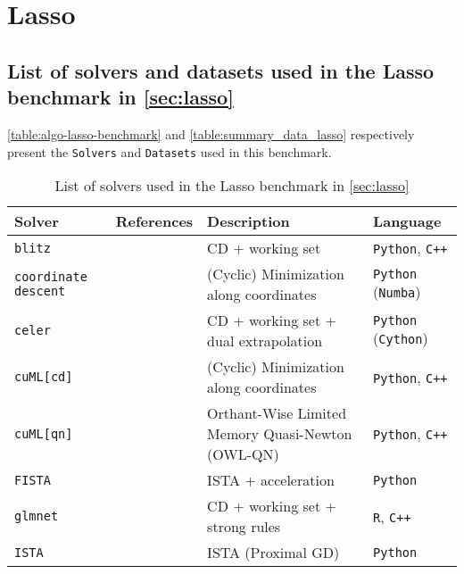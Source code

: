 \documentclass{article}
\begin{document}
\clearpage{}

\section{Lasso}\label{app:sec:lasso}

\subsection{List of solvers and datasets used in the Lasso benchmark in \autoref{sec:lasso}}

\autoref{table:algo-lasso-benchmark} and \autoref{table:summary_data_lasso} respectively present the \texttt{Solvers} and \texttt{Datasets} used in this benchmark.
\begin{table}[h]
  \centering
  \footnotesize
  \caption{List of solvers used in the Lasso benchmark in \autoref{sec:lasso}}
  \addtolength{\tabcolsep}{-1pt}
\begin{tabular}{l p{4cm} p{3cm} l}
  \toprule
  \textbf{Solver} & \textbf{References} & \textbf{Description} & \textbf{Language}\\
  \midrule
  \texttt{blitz} &\citet{johnson2015blitz}
                 & CD + working set
                 & \texttt{Python}, \texttt{C++}\\
  \texttt{coordinate descent} &\citet{Friedman_10}
                              & (Cyclic) Minimization along coordinates
                              & \texttt{Python} (\texttt{Numba})\\
  \texttt{celer} &\citet{Massias_Gramfort_Salmon2018}
                 & CD + working set + dual extrapolation
                 & \texttt{Python} (\texttt{Cython})\\
\texttt{cuML[cd]} &\citet{Raschka2020a}
                  & (Cyclic) Minimization along coordinates
                  & \texttt{Python}, \texttt{C++}\\
\texttt{cuML[qn]} &\citet{Raschka2020a}
                  & Orthant-Wise Limited Memory Quasi-Newton (OWL-QN)
                  & \texttt{Python}, \texttt{C++}\\
\texttt{FISTA}    &\citet{Beck_Teboulle09}
                  & ISTA + acceleration
                  & \texttt{Python}\\
  \texttt{glmnet} &\citet{Friedman_10}
                  & CD + working set + strong rules
                  & \texttt{R}, \texttt{C++}\\
  \texttt{ISTA} &\citet{Daubechies2004}
                & ISTA (Proximal GD)
                & \texttt{Python}\\

\end{tabular}
\end{table}
\end{document}
